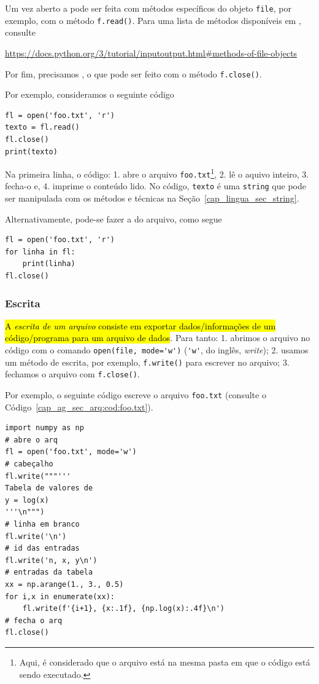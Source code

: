 Um vez aberto a  pode ser feita com métodos específicos do objeto {\lstinline+file+}, por exemplo, com o método {\lstinline+f.read()+}. Para uma lista de métodos disponíveis em {\python}, consulte
\begin{center}
  \url{https://docs.python.org/3/tutorial/inputoutput.html#methods-of-file-objects}
\end{center}
Por fim, precisamos , o que pode ser feito com o método {\lstinline+f.close()+}.

Por exemplo, consideramos o seguinte código
\begin{lstlisting}
fl = open('foo.txt', 'r')
texto = fl.read()
fl.close()
print(texto)
\end{lstlisting}
Na primeira linha, o código: 1. abre o arquivo \lstinline+foo.txt+\footnote{Aqui, é considerado que o arquivo está na mesma pasta em que o código está sendo executado.}, 2. lê o aquivo inteiro, 3. fecha-o e, 4. imprime o conteúdo lido. No código, \lstinline+texto+ é uma \lstinline+string+ que pode ser manipulada com os métodos e técnicas na Seção~\ref{cap_lingua_sec_string}.

Alternativamente, pode-se fazer a  do arquivo, como segue
\begin{lstlisting}
fl = open('foo.txt', 'r')
for linha in fl:
    print(linha)
fl.close()
\end{lstlisting}

\subsubsection{Escrita}

\hl{A \emph{escrita de um arquivo} consiste em exportar dados/informações de um código/programa para um arquivo de dados}. Para tanto: 1. abrimos o arquivo no código com o comando \lstinline+open(file, mode='w')+ (\lstinline+'w'+, do inglês, \textit{write}); 2. usamos um método de escrita, por exemplo, \lstinline+f.write()+ para escrever no arquivo; 3. fechamos o arquivo com \lstinline+f.close()+.

Por exemplo, o seguinte código escreve o arquivo \lstinline+foo.txt+ (consulte o Código~\ref{cap_ag_sec_arq:cod:foo.txt}).
\begin{lstlisting}[caption=foo.py, label=cap_ag_sec_arq:cod:foo.py]
import numpy as np
# abre o arq
fl = open('foo.txt', mode='w')
# cabeçalho
fl.write("""'''
Tabela de valores de
y = log(x)
'''\n""")
# linha em branco
fl.write('\n')
# id das entradas
fl.write('n, x, y\n')
# entradas da tabela
xx = np.arange(1., 3., 0.5)
for i,x in enumerate(xx):
    fl.write(f'{i+1}, {x:.1f}, {np.log(x):.4f}\n')
# fecha o arq
fl.close()
\end{lstlisting}

